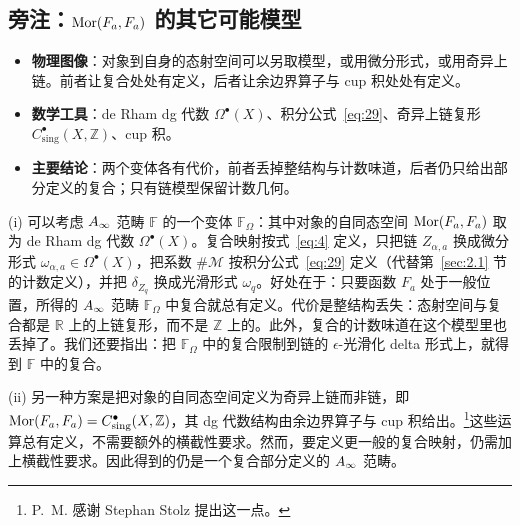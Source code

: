 \subsection{旁注：$\operatorname{Mor}(F_a,F_a)$ 的其它可能模型}\label{sec:2.7}

\begin{takeaway}
\begin{itemize}
  \item \textbf{物理图像}：对象到自身的态射空间可以另取模型，或用微分形式，或用奇异上链。前者让复合处处有定义，后者让余边界算子与 cup 积处处有定义。
  \item \textbf{数学工具}：de Rham dg 代数 $\Omega^\bullet(X)$、积分公式~\eqref{eq:29}、奇异上链复形 $C^\bullet_{\mathrm{sing}}(X,\mathbb Z)$、cup 积。
  \item \textbf{主要结论}：两个变体各有代价，前者丢掉整结构与计数味道，后者仍只给出部分定义的复合；只有链模型保留计数几何。
\end{itemize}
\end{takeaway}

(i) 可以考虑 $A_\infty$ 范畴 $\mathbb{F}$ 的一个变体 $\mathbb{F}_\Omega$：其中对象的自同态空间 $\operatorname{Mor}(F_a,F_a)$ 取为 de Rham dg 代数 $\Omega^\bullet(X)$。复合映射按式~\eqref{eq:4} 定义，只把链 $Z_{\alpha,a}$ 换成微分形式 $\omega_{\alpha,a}\in\Omega^\bullet(X)$，把系数 $\#\mathcal M$ 按积分公式~\eqref{eq:29} 定义（代替第~\ref{sec:2.1} 节的计数定义），并把 $\delta_{Z_q}$ 换成光滑形式 $\omega_q$。好处在于：只要函数 $F_a$ 处于一般位置，所得的 $A_\infty$ 范畴 $\mathbb{F}_\Omega$ 中复合就总有定义。代价是整结构丢失：态射空间与复合都是 $\mathbb R$ 上的上链复形，而不是 $\mathbb Z$ 上的。此外，复合的计数味道在这个模型里也丢掉了。我们还要指出：把 $\mathbb{F}_\Omega$ 中的复合限制到链的 $\epsilon$-光滑化 delta 形式上，就得到 $\mathbb{F}$ 中的复合。


(ii) 另一种方案是把对象的自同态空间定义为奇异上链而非链，即 $\operatorname{Mor}(F_a,F_a)=C^\bullet_{\mathrm{sing}}(X,\mathbb Z)$，其 dg 代数结构由余边界算子与 cup 积给出。\footnote{P.~M. 感谢 Stephan Stolz 提出这一点。}这些运算总有定义，不需要额外的横截性要求。然而，要定义更一般的复合映射，仍需加上横截性要求。因此得到的仍是一个复合部分定义的 $A_\infty$ 范畴。

